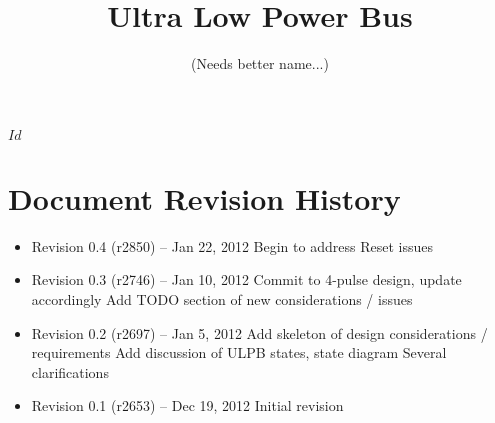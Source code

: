 \documentclass{article}
\newcommand{\bus}{ULPB\xspace}
\begin{document}
\svnInfo $Id$ 

\pagestyle{fancyplain}

\title{Ultra Low Power Bus}
\author{(Needs better name...)}
\date{}
\maketitle

\tableofcontents
\clearpage


\clearpage
%
%
%

%

\clearpage
\section{Document Revision History}
\label{sec:revisions}

\begin{itemize}

\item Revision 0.4 {\footnotesize(r2850)} -- Jan 22, 2012
\subitem Begin to address Reset issues

\item Revision 0.3 {\footnotesize(r2746)} -- Jan 10, 2012
\subitem Commit to 4-pulse design, update accordingly
\subitem Add TODO section of new considerations / issues

\item Revision 0.2 {\footnotesize(r2697)} -- Jan 5, 2012
\subitem Add skeleton of design considerations / requirements
\subitem Add discussion of \bus states, state diagram
\subitem Several clarifications

\item Revision 0.1 {\footnotesize(r2653)} -- Dec 19, 2012
\subitem Initial revision

\end{itemize}
\end{document}
